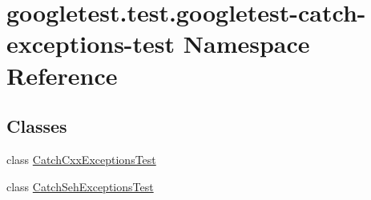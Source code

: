 \hypertarget{namespacegoogletest_1_1test_1_1googletest-catch-exceptions-test}{}\section{googletest.\+test.\+googletest-\/catch-\/exceptions-\/test Namespace Reference}
\label{namespacegoogletest_1_1test_1_1googletest-catch-exceptions-test}
\subsection*{Classes}
\begin{DoxyCompactItemize}
\item 
class \mbox{\hyperlink{classgoogletest_1_1test_1_1googletest-catch-exceptions-test_1_1_catch_cxx_exceptions_test}{Catch\+Cxx\+Exceptions\+Test}}
\item 
class \mbox{\hyperlink{classgoogletest_1_1test_1_1googletest-catch-exceptions-test_1_1_catch_seh_exceptions_test}{Catch\+Seh\+Exceptions\+Test}}
\end{DoxyCompactItemize}
